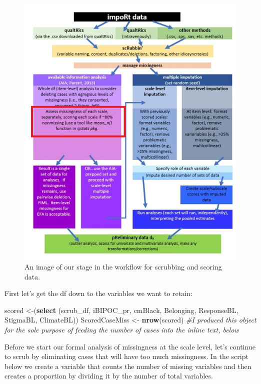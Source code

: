 \documentclass[
  11pt,
]{book}
\newenvironment{Shaded}{\begin{snugshade}}{\end{snugshade}}
\newcommand{\CommentTok}[1]{\textcolor[rgb]{0.37,0.37,0.37}{\textit{#1}}}
\newcommand{\FunctionTok}[1]{\textcolor[rgb]{0.27,0.27,0.27}{\textbf{#1}}}
\newcommand{\NormalTok}[1]{#1}
\newcommand{\OtherTok}[1]{\textcolor[rgb]{0.37,0.37,0.37}{#1}}
\begin{document}
\begin{figure}
\centering
\includegraphics{images/Ch02/wrkflow_scale_lvl.jpg}
\caption{An image of our stage in the workflow for scrubbing and scoring data.}
\end{figure}

First let's get the df down to the variables we want to retain:

\begin{Shaded}
\begin{Highlighting}[]
\NormalTok{scored }\OtherTok{\textless{}{-}}\NormalTok{(}\FunctionTok{select}\NormalTok{ (scrub\_df, iBIPOC\_pr, cmBlack, Belonging, ResponseBL, StigmaBL, ClimateBL))}
\NormalTok{ScoredCaseMiss }\OtherTok{\textless{}{-}} \FunctionTok{nrow}\NormalTok{(scored) }\CommentTok{\#I produced this object for the sole purpose of feeding the number of cases into the inline text, below}
\end{Highlighting}
\end{Shaded}

Before we start our formal analysis of missingness at the scale level, let's continue to scrub by eliminating cases that will have too much missingness. In the script below we create a variable that counts the number of missing variables and then creates a proportion by dividing it by the number of total variables.
\end{document}
